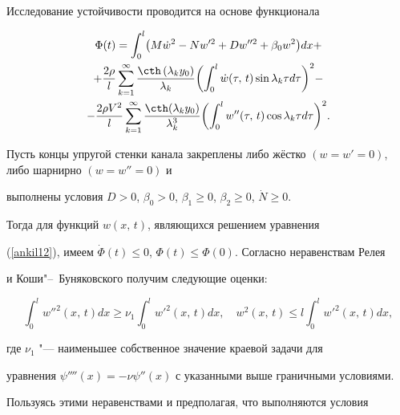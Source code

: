 Исследование устойчивости проводится на основе функционала

\begin{multline*}


 \Phi (t) = \int _0^l \bigl( M \dot {w}^2 - N w'^2 + D{w}''^2 +  \beta _0 w^2 \bigr) dx  +  \\ +

 \frac{2 \rho} {l} \sum\limits_{k = 1}^\infty  \frac{\cth \left(\lambda _k y_0 \right)}{\lambda _k}  \biggl( \int _0^l \dot {w} (\tau,\,t ) \sin \lambda _k \tau  d \tau  \biggr)^2 - \\ - \frac{2 \rho V^2}{l} \sum \limits_{k =

1}^\infty  \frac{ \cth (\lambda_k y_0 )}{\lambda

_k^3}  \biggl( \int _0^l w'' (\tau,\,t ) \cos \lambda_k \tau d \tau  \biggr)^2.

\end{multline*}

Пусть концы упругой стенки канала закреплены либо жёстко \mbox{$ (w = w' = 0)$}, либо шарнирно $(w = w'' = 0)$ и

выполнены условия $D > 0$, $\beta _0 > 0$, $\beta _1 \ge 0$, $\beta

_2 \ge 0$, $\dot N \ge 0$.



Тогда для функций $w (x,\,t)$, являющихся решением уравнения

(\ref{ankil12}), имеем $\dot \Phi (t) \le 0$, $\Phi (t) \le \Phi (0)$. Согласно неравенствам Релея

\cite{ankBibl1} и Коши"--~Буняковского получим следующие оценки:

\begin{equation}

\label{ankil14}

\int _0^l w''^2  (x,\,t) dx \ge \nu_1

\int _0^l w'^2 (x,\,t)dx, \quad  w^2 (x,\,t) \le l \int_0^l w'^2 (x,\,t)dx,

\end{equation}

где $\nu_1$ "--- наименьшее собственное значение краевой задачи для

уравнения $\psi'''' (x) = - \nu \psi'' (x)$ с указанными выше граничными условиями.

Пользуясь этими неравенствами и предполагая, что выполняются условия

$$

